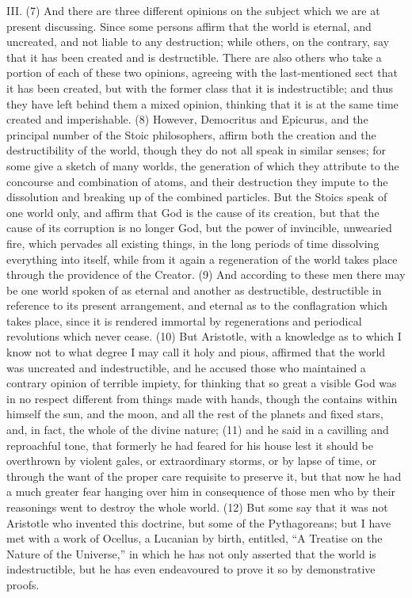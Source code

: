 III. (7) And there are three different opinions on the subject which we are at present discussing.
Since some persons affirm that the world is eternal, and uncreated, and not liable to any
destruction; while others, on the contrary, say that it has been created and is destructible. There
are also others who take a portion of each of these two opinions, agreeing with the last-mentioned
sect that it has been created, but with the former class that it is indestructible; and thus they have
left behind them a mixed opinion, thinking that it is at the same time created and imperishable. (8)
However, Democritus and Epicurus, and the principal number of the Stoic philosophers, affirm both
the creation and the destructibility of the world, though they do not all speak in similar senses; for
some give a sketch of many worlds, the generation of which they attribute to the concourse and
combination of atoms, and their destruction they impute to the dissolution and breaking up of the
combined particles. But the Stoics speak of one world only, and affirm that God is the cause of its
creation, but that the cause of its corruption is no longer God, but the power of invincible,
unwearied fire, which pervades all existing things, in the long periods of time dissolving everything
into itself, while from it again a regeneration of the world takes place through the providence of the
Creator. (9) And according to these men there may be one world spoken of as eternal and another
as destructible, destructible in reference to its present arrangement, and eternal as to the
conflagration which takes place, since it is rendered immortal by regenerations and periodical
revolutions which never cease. (10) But Aristotle, with a knowledge as to which I know not to what
degree I may call it holy and pious, affirmed that the world was uncreated and indestructible, and he
accused those who maintained a contrary opinion of terrible impiety, for thinking that so great a
visible God was in no respect different from things made with hands, though the contains within
himself the sun, and the moon, and all the rest of the planets and fixed stars, and, in fact, the whole
of the divine nature; (11) and he said in a cavilling and reproachful tone, that formerly he had
feared for his house lest it should be overthrown by violent gales, or extraordinary storms, or by
lapse of time, or through the want of the proper care requisite to preserve it, but that now he had a
much greater fear hanging over him in consequence of those men who by their reasonings went to
destroy the whole world. (12) But some say that it was not Aristotle who invented this doctrine, but
some of the Pythagoreans; but I have met with a work of Ocellus, a Lucanian by birth, entitled, ``A
Treatise on the Nature of the Universe,'' in which he has not only asserted that the world is
indestructible, but he has even endeavoured to prove it so by demonstrative proofs.

